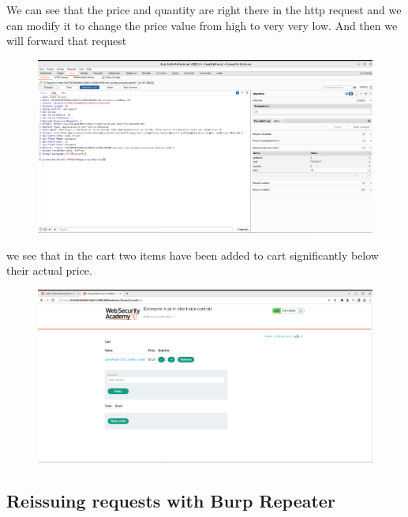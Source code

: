 \documentclass[
	a4paper, %
	12pt, %
]{CSSullivanBusinessReport}
\begin{document}
\begin{fullwidth}
\begin{figure}[H]
\end{figure}
We can see that the price and quantity are right there in the http request and we can modify it to change the price value from high to very very low. And then we will forward that request
\begin{figure}[H]
    \centering
    \includegraphics[width=1\textwidth]{Images/anikaScreensots/lab4.png}

\end{figure}

we see that in the cart two items have been added to cart significantly below their actual price.
\begin{figure}[H]
    \centering
    \includegraphics[width=1\textwidth]{Images/anikaScreensots/lab5.png}

\end{figure}
\end{fullwidth}
\subsection*{Reissuing requests with Burp Repeater}
\end{document}
